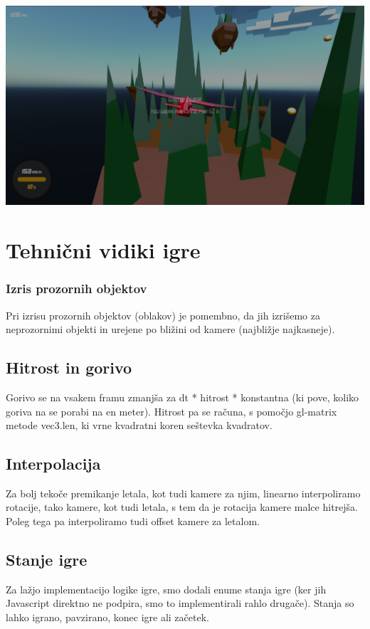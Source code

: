 \documentclass[a4paper]{article}
\begin{document}
\begin{center}
     \includegraphics[width=\columnwidth]{game over.jpg}
\end{center}

\section{Tehnični vidiki igre} %
\subsubsection{Izris prozornih objektov}%
Pri izrisu prozornih objektov (oblakov) je pomembno, da jih izrišemo za neprozornimi objekti in urejene po bližini od kamere (najbližje najkasneje).
\subsection{Hitrost in gorivo}%
Gorivo se na vsakem framu zmanjša za dt * hitrost * konstantna (ki pove, koliko goriva na se porabi na en meter). Hitrost pa se računa, s pomočjo gl-matrix metode vec3.len, ki vrne kvadratni koren seštevka kvadratov.
\subsection{Interpolacija}%
Za bolj tekoče premikanje letala, kot tudi kamere za njim, linearno interpoliramo rotacije, tako kamere, kot tudi letala, s tem da je rotacija kamere malce hitrejša. Poleg tega pa interpoliramo tudi offset kamere za letalom. 
\subsection{Stanje igre}%
Za lažjo implementacijo logike igre, smo dodali enume stanja igre (ker jih Javascript direktno ne podpira, smo to implementirali rahlo drugače). Stanja so lahko igrano, pavzirano, konec igre ali začetek. 
\end{document}
